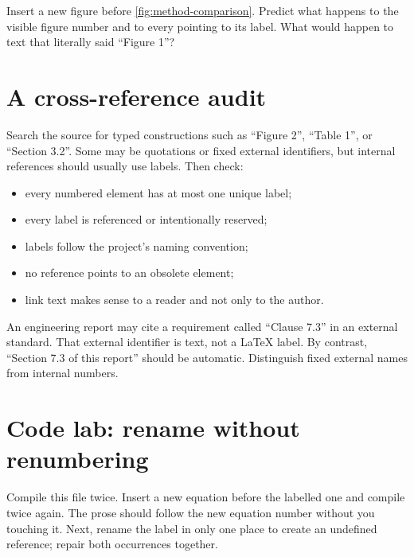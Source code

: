 \begin{pausepredict}
Insert a new figure before \cref{fig:method-comparison}. Predict what happens
to the visible figure number and to every  pointing to its label.
What would happen to text that literally said ``Figure 1''?
\end{pausepredict}

\section{A cross-reference audit}

Search the source for typed constructions such as ``Figure 2'', ``Table 1'',
or ``Section 3.2''. Some may be quotations or fixed external identifiers, but
internal references should usually use labels. Then check:

\begin{itemize}
  \item every numbered element has at most one unique label;
  \item every label is referenced or intentionally reserved;
  \item labels follow the project's naming convention;
  \item no reference points to an obsolete element;
  \item link text makes sense to a reader and not only to the author.
\end{itemize}

\begin{scienceinpractice}
An engineering report may cite a requirement called ``Clause 7.3'' in an
external standard. That external identifier is text, not a \LaTeX{} label. By
contrast, ``Section 7.3 of this report'' should be automatic. Distinguish fixed
external names from internal numbers.
\end{scienceinpractice}

\section{Code lab: rename without renumbering}

\begin{codelab}
Compile this file twice. Insert a new equation before the labelled one and
compile twice again. The prose should follow the new equation number without
you touching it. Next, rename the label in only one place to create an
undefined reference; repair both occurrences together.
\end{codelab}

